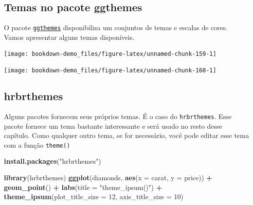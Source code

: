 \documentclass[]{book}
\newenvironment{Shaded}{\begin{snugshade}}{\end{snugshade}}
\newcommand{\KeywordTok}[1]{\textcolor[rgb]{0.13,0.29,0.53}{\textbf{#1}}}
\newcommand{\DataTypeTok}[1]{\textcolor[rgb]{0.13,0.29,0.53}{#1}}
\newcommand{\DecValTok}[1]{\textcolor[rgb]{0.00,0.00,0.81}{#1}}
\newcommand{\StringTok}[1]{\textcolor[rgb]{0.31,0.60,0.02}{#1}}
\newcommand{\OperatorTok}[1]{\textcolor[rgb]{0.81,0.36,0.00}{\textbf{#1}}}
\newcommand{\NormalTok}[1]{#1}
\begin{document}
\subsection{Temas no pacote ggthemes}\label{temas-no-pacote-ggthemes}

O pacote \href{https://github.com/jrnold/ggthemes}{\texttt{ggthemes}}
disponibiliza um conjuntos de temas e escalas de cores. Vamos apresentar
alguns temas disponíveis.

\begin{center}\texttt{[image: bookdown-demo\_files/figure-latex/unnamed-chunk-159-1]} \end{center}

\begin{center}\texttt{[image: bookdown-demo\_files/figure-latex/unnamed-chunk-160-1]} \end{center}

\subsection{hrbrthemes}\label{hrbrthemes}

Alguns pacotes fornecem seus próprios temas. É o caso do
\texttt{hrbrthemes}. Esse pacote fornece um tema bastante interessante e
será usado no resto desse capítulo. Como qualquer outro tema, se for
necessário, você pode editar esse tema com a função \texttt{theme()}

\begin{Shaded}
\begin{Highlighting}[]
\KeywordTok{install.packages}\NormalTok{(}\StringTok{"hrbrthemes"}\NormalTok{)}
\end{Highlighting}
\end{Shaded}

\begin{Shaded}
\begin{Highlighting}[]
\KeywordTok{library}\NormalTok{(hrbrthemes)}
\KeywordTok{ggplot}\NormalTok{(diamonds, }\KeywordTok{aes}\NormalTok{(}\DataTypeTok{x =}\NormalTok{ carat, }\DataTypeTok{y =}\NormalTok{ price)) }\OperatorTok{+}
\StringTok{  }\KeywordTok{geom_point}\NormalTok{() }\OperatorTok{+}
\StringTok{  }\KeywordTok{labs}\NormalTok{(}\DataTypeTok{title =} \StringTok{"theme_ipsum()"}\NormalTok{) }\OperatorTok{+}
\StringTok{  }\KeywordTok{theme_ipsum}\NormalTok{(}\DataTypeTok{plot_title_size =} \DecValTok{12}\NormalTok{,}
              \DataTypeTok{axis_title_size =} \DecValTok{10}\NormalTok{)}
\end{Highlighting}
\end{Shaded}
\end{document}
